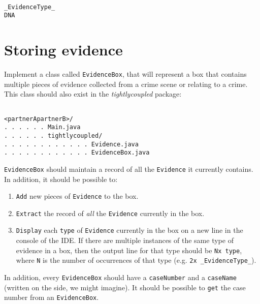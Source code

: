 \documentclass[11pt]{article}
\begin{document}
\begin{verbatim}

_EvidenceType_
DNA

\end{verbatim}

\vspace{-8mm}

\section{Storing evidence}

Implement a class called \texttt{EvidenceBox}, that will represent a box that contains multiple pieces of evidence collected from a crime scene or relating to a crime. This class should also exist in the \emph{tightlycoupled} package:

\vspace{-8mm}

\begin{verbatim}

<partnerApartnerB>/
. . . . . . Main.java
. . . . . . tightlycoupled/
. . . . . . . . . . . . Evidence.java
. . . . . . . . . . . . EvidenceBox.java

\end{verbatim}

\vspace{-8mm}

\texttt{EvidenceBox} should maintain a record of all the \texttt{Evidence} it currently contains. In addition, it should be possible to:

\begin{enumerate}

	\item \texttt{Add} new pieces of \texttt{Evidence} to the box.
	\item \texttt{Extract} the record of \emph{all} the \texttt{Evidence} currently in the box.
	\item \texttt{Display} each \texttt{type} of \texttt{Evidence} currently in the box on a new line in the console of the IDE. If there are multiple instances of the same type of evidence in a box, then the output line for that type should be \verb=Nx type=, where \verb=N= is the number of occurrences of that type (e.g. \verb=2x _EvidenceType_=).

\end{enumerate}

In addition, every \texttt{EvidenceBox} should have a \texttt{caseNumber} and a \texttt{caseName} (written on the side, we might imagine). It should be possible to \texttt{get} the case number  from an \texttt{EvidenceBox}.
\end{document}
